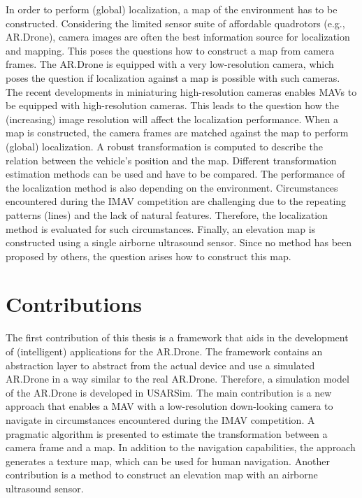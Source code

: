 In order to perform (global) localization, a map of the environment has to be constructed.
Considering the limited sensor suite of affordable quadrotors (e.g., AR.Drone), camera images are often the best information source for localization and mapping.
This poses the questions how to construct a map from camera frames.
The AR.Drone is equipped with a very low-resolution camera, which poses the question if localization against a map is possible with such cameras.
The recent developments in miniaturing high-resolution cameras enables MAVs to be equipped with high-resolution cameras.
This leads to the question how the (increasing) image resolution will affect the localization performance.
When a map is constructed, the camera frames are matched against the map to perform (global) localization.
A robust transformation is computed to describe the relation between the vehicle's position and the map.
Different transformation estimation methods can be used and have to be compared.
The performance of the localization method is also depending on the environment.
Circumstances encountered during the IMAV competition are challenging due to the repeating patterns (lines) and the lack of natural features.
Therefore, the localization method is evaluated for such circumstances.
Finally, an elevation map is constructed using a single airborne ultrasound sensor.
Since no method has been proposed by others, the question arises how to construct this map.





\section{Contributions}
The first contribution of this thesis is a framework that aids in the development of (intelligent) applications for the AR.Drone.
The framework contains an abstraction layer to abstract from the actual device and use a simulated AR.Drone in a way similar to the real AR.Drone.
Therefore, a simulation model of the AR.Drone is developed in USARSim.
The main contribution is a new approach that enables a MAV with a low-resolution down-looking camera to navigate in circumstances encountered during the IMAV competition.
A pragmatic algorithm is presented to estimate the transformation between a camera frame and a map.
In addition to the navigation capabilities, the approach generates a texture map, which can be used for human navigation.
Another contribution is a method to construct an elevation map with an airborne ultrasound sensor.


